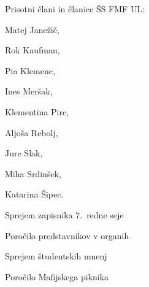 \documentclass{seja}
\begin{document}
  
  Prisotni člani in članice ŠS FMF UL:

  Matej Janežič,

  Rok Kaufman,

  Pia Klemenc,

  Ines Meršak,

  Klementina Pirc,

  Aljoša Rebolj,

  Jure Slak,

  Miha Srdinšek,

  Katarina Šipec.

  
  \begin{red*}

    \item

    Sprejem zapisnika 7.~redne seje

    \item

    Poročilo predstavnikov v organih

    \item

    Sprejem študentskih mnenj

    \item

    Poročilo Mafijskega piknika

  \end{red*}
\end{document}
